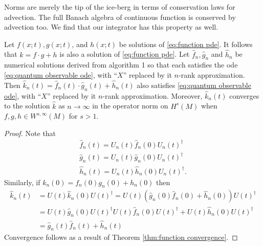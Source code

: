 \documentclass[final,leqno]{siamltex1213}
\begin{document}
Norms are merely the tip of the ice-berg in terms of conservation laws for advection.
The full Banach algebra of continuous function is conserved by advection too.
We find that our integrator has this property as well.
\begin{theorem} \label{thm:algebra}
	Let $f(x;t),g(x;t)$, and $h(x;t)$ be solutions of \eqref{eq:function pde}.
	It follows that $k= f \cdot g + h $ is also a solution of \eqref{eq:function pde}.
	Let $\hat{f}_{n}, \hat{g}_{n}$ and $\hat{h}_{n}$ be numerical solutions derived from algorithm 1
	so that each satisfies the ode \eqref{eq:quantum observable ode}, with ``$X$'' replaced by it $n$-rank approximation.
	Then $\hat{k}_{n}(t) = \hat{f}_{n}(t) \cdot \hat{g}_{n}(t) + \hat{h}_{n}(t)$ also satisfies \eqref{eq:quantum observable ode}, with ``$X$'' replaced by it $n$-rank approximation.
	Moreover, $\hat{k}_{n}(t)$ converges to the solution $\hat{k}$ as $n \to \infty$ in the operator norm on $H^{s}(M)$ when $f,g,h \in W^{s,\infty}(M)$ for $s>1$.
\end{theorem}
\begin{proof}
	Note that 
	\begin{align}
		\hat{f}_{n}(t) = U_{n}(t) \hat{f}_{n}(0) U_{n}(t)^{\dagger} \\
		\hat{g}_{n}(t) = U_{n}(t) \hat{g}_{n}(0) U_{n}(t)^{\dagger} \\
		\hat{h}_{n}(t) = U_{n}(t) \hat{h}_{n}(0) U_{n}(t)^{\dagger}.
	\end{align}
	Similarly, if $k_{n}(0) = f_{n}(0) g_{n}(0) + h_{n}(0)$ then
	\begin{align}
		\hat{k}_{n}(t) &= U(t) \hat{k}_{n}(0) U(t)^{\dagger} = U(t)\left( \hat{g}_{n}(0) \hat{f}_{n}(0) + \hat{h}_{n}(0) \right) U(t)^{\dagger} \\
			&= U(t) \hat{g}_{n}(0) U(t)^{\dagger} U(t) \hat{f}_{n}(0) U(t)^{\dagger} + U(t) \hat{h}_{n}(0) U(t)^{\dagger} \\
			&= \hat{g}_{n}(t) \hat{f}_{n}(t) + \hat{h}_{n}(t)
	\end{align}
	Convergence follows as a result of Theorem \ref{thm:function convergence}.
\end{proof}
\end{document}
